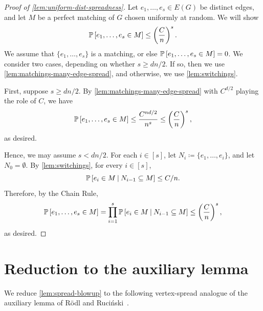 \documentclass[11pt]{amsart}
\begin{document}
\begin{proof}[Proof of \cref{lem:uniform-dist-spreadness}]
    Let $e_1, \dots, e_s \in E(G)$ be distinct edges, and let $M$ be a perfect matching of $G$ chosen uniformly at random.  We will show 
    \begin{equation*}
         \mathbb P\left[e_1, \dots, e_s \in M\right]  \leq \left(\frac{C}{n}\right)^s.
    \end{equation*}
    We assume that $\{e_1, \dots, e_s\}$ is a matching, or else $ \mathbb P\left[e_1, \dots, e_s \in M\right]  = 0$.  We consider two cases, depending on whether $s \geq dn / 2$.  If so, then we use \cref{lem:matchings-many-edge-spread}, and otherwise, we use \cref{lem:switchings}.

    First, suppose $s \geq dn / 2$.  By \cref{lem:matchings-many-edge-spread} with $C^{d/ 2}$ playing the role of $C$, we have
    \begin{equation*}
         \mathbb P\left[e_1, \dots, e_s \in M\right]  \leq \frac{C^{nd / 2}}{n^s} \leq \left(\frac{C}{n}\right)^s,
    \end{equation*}
    as desired.

    Hence, we may assume $s < dn / 2$.  For each $i \in [s]$, let $N_i \coloneqq \{e_1, \dots, e_i\}$, and let $N_0 = \emptyset$.
    By \cref{lem:switchings}, for every $i \in [s]$,
    \begin{equation*}
         \mathbb P\left[e_i \in M\:\middle|\:N_{i-1} \subseteq M\right]  \leq C / n.
    \end{equation*}
    Therefore, by the Chain Rule,
    \begin{equation*}
         \mathbb P\left[e_1, \dots, e_s \in M\right]  = \prod_{i=1}^s \mathbb P\left[e_i \in M\:\middle|\:N_{i-1} \subseteq M\right]  \leq \left(\frac{C}{n}\right)^s,
    \end{equation*}
    as desired.
\end{proof}

\section{Reduction to the auxiliary lemma}\label{sect:blow-up-reduction}

We reduce \cref{lem:spread-blowup} to the following vertex-spread analogue of
the auxiliary lemma of R\"{o}dl and Ruci\'{n}ski~\cite{RR99}.
\end{document}
